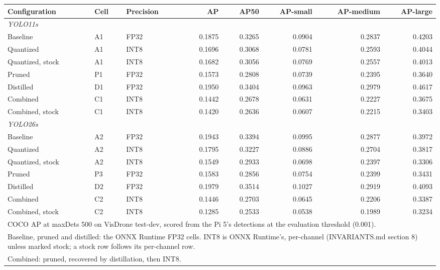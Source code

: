 \begin{tabular}{lllrrrrr}
\toprule
Configuration & Cell & Precision & AP & AP50 & AP-small & AP-medium & AP-large \\
\midrule
\multicolumn{8}{l}{\textit{YOLO11s}} \\
Baseline & A1 & FP32 & 0.1875 & 0.3265 & 0.0904 & 0.2837 & 0.4203 \\
Quantized & A1 & INT8 & 0.1696 & 0.3068 & 0.0781 & 0.2593 & 0.4044 \\
Quantized, stock & A1 & INT8 & 0.1682 & 0.3056 & 0.0769 & 0.2557 & 0.4013 \\
Pruned & P1 & FP32 & 0.1573 & 0.2808 & 0.0739 & 0.2395 & 0.3640 \\
Distilled & D1 & FP32 & 0.1950 & 0.3404 & 0.0963 & 0.2979 & 0.4617 \\
Combined & C1 & INT8 & 0.1442 & 0.2678 & 0.0631 & 0.2227 & 0.3675 \\
Combined, stock & C1 & INT8 & 0.1420 & 0.2636 & 0.0607 & 0.2215 & 0.3403 \\
\midrule
\multicolumn{8}{l}{\textit{YOLO26s}} \\
Baseline & A2 & FP32 & 0.1943 & 0.3394 & 0.0995 & 0.2877 & 0.3972 \\
Quantized & A2 & INT8 & 0.1795 & 0.3227 & 0.0886 & 0.2704 & 0.3817 \\
Quantized, stock & A2 & INT8 & 0.1549 & 0.2933 & 0.0698 & 0.2397 & 0.3306 \\
Pruned & P3 & FP32 & 0.1583 & 0.2856 & 0.0754 & 0.2399 & 0.3431 \\
Distilled & D2 & FP32 & 0.1979 & 0.3514 & 0.1027 & 0.2919 & 0.4093 \\
Combined & C2 & INT8 & 0.1446 & 0.2703 & 0.0645 & 0.2206 & 0.3387 \\
Combined, stock & C2 & INT8 & 0.1285 & 0.2533 & 0.0538 & 0.1989 & 0.3234 \\
\bottomrule
\multicolumn{8}{l}{\footnotesize COCO AP at maxDets 500 on VisDrone test-dev, scored from the Pi 5's detections at the evaluation threshold (0.001).} \\
\multicolumn{8}{l}{\footnotesize Baseline, pruned and distilled: the ONNX Runtime FP32 cells. INT8 is ONNX Runtime's, per-channel (INVARIANTS.md section 8) unless marked stock; a stock row follows its per-channel row.} \\
\multicolumn{8}{l}{\footnotesize Combined: pruned, recovered by distillation, then INT8.} \\
\end{tabular}
